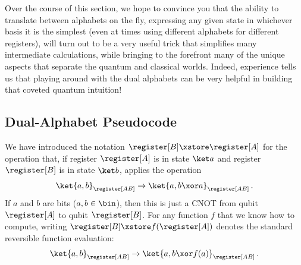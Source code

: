     Over the course of this section, we hope to convince you that
      the ability to translate between alphabets on the fly, expressing any
      given state in whichever basis it is the simplest (even at times using
      different alphabets for different registers), will turn out to be a
      very useful trick that simplifies many intermediate calculations, 
      while bringing to the forefront many of the unique aspects that separate
      the quantum and classical worlds.
      Indeed, experience tells us that
      playing around with the dual alphabets can be very 
      helpful in building that coveted quantum intuition! 

  \subsection{Dual-Alphabet Pseudocode}
    We have introduced the notation $\register[B] \xstore \register[A]$ for the
      operation that, if register $\register[A]$ is in state $\ket a$ and
      register $\register[B]$ is in state $\ket b$, applies the operation 
      \[
        \ket{a,b}_{\register[AB]} \to \ket{a, b \xor a}_{\register[AB]}\, .
      \]
      If $a$ and $b$ are bits ($a,b \in \bin$), then this is just a CNOT
      from qubit $\register[A]$ to qubit $\register[B]$.
      For any function $f$ that we know how to compute, 
      writing $\register[B] \xstore f(\register[A])$ denotes the standard 
      reversible function evaluation:
      \[
        \ket{a,b}_{\register[AB]} \to \ket{a, b \xor f(a)}_{\register[AB]}\, .
      \]

